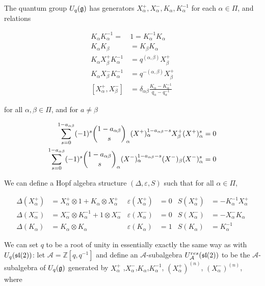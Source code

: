     \begin{defn}
    \label{UqgDef}
        The quantum group $U_q(\mathfrak{g})$ has generators
        $ X^+ _\alpha, X^-_\alpha, K_\alpha, K_\alpha^{-1}$ for each $\alpha \in
        \Pi$, and relations

        \begin{align}
            K_\alpha K_\alpha^{-1} =\ &1  = K_\alpha^{-1}K_\alpha \\
            K_\alpha K_\beta &= K_\beta K_\alpha \\
            K_\alpha  X^+ _\beta K_\alpha^{-1} &= q^{(\alpha, \beta)}  X^+ _\beta \\
            K_\alpha X^-_\beta K_\alpha^{-1} &= q^{-(\alpha, \beta)}  X^+ _\beta \\
            [ X^+ _\alpha, X^-_\beta] &= \delta_{\alpha\beta} \frac{K_\alpha - K_\alpha^{-1}}{ q_\alpha - q_\alpha^{-1}} 
        \end{align}

        for all $\alpha, \beta \in \Pi$, and for $a \neq \beta$

        \begin{align}
            \sum_{s=0}^{1-a_{\alpha\beta}} (-1)^s \dbinom{1-a_{\alpha\beta}}{s}_\alpha  (X^+)_\alpha^{1-a_{\alpha\beta} - s}  X^+_\beta  (X^+)_\alpha^s  &= 0 \\
            \sum_{s=0}^{1-a_{\alpha\beta}} (-1)^s \dbinom{1-a_{\alpha\beta}}{s}_\alpha (X^-)_\alpha^{1-a_{\alpha\beta} - s} (X^-)_\beta (X^-)_\alpha^s  &= 0 
        \end{align}
    \end{defn}

We can define a Hopf algebra structure $(\Delta, \varepsilon, S)$ such
that for all $\alpha \in \Pi$,

    \begin{align}
        \Delta(X^+ _\alpha) &=  X^+ _\alpha \otimes 1 + K_\alpha \otimes  X^+ _\alpha      & \varepsilon(X^+ _\alpha) &= 0  & S(X^+ _\alpha) &= -K_\alpha^{-1}  X^+ _\alpha \\
        \Delta(X^-_\alpha) &= X^-_\alpha \otimes K_\alpha^{-1} + 1 \otimes X^-_\alpha & \varepsilon(X^-_\alpha) &= 0  & S(X^-_\alpha) &= -X^-_\alpha K_\alpha \\
        \Delta(K_\alpha) &= K_\alpha \otimes K_\alpha                           & \varepsilon(K_\alpha) &= 1  & S(K_\alpha) &= K_\alpha^{-1}
    \end{align}


We can set $q$ to be a root of unity in essentially exactly the same way as
with $U_q(\mathfrak{sl}(2))$: let $\mathcal{A} = \mathbb{Z}[q,q^{-1}]$ and define an 
$\mathcal{A}$-subalgebra $U_\mathcal{A}^{res}(\mathfrak{sl}(2))$ to be the
$\mathcal{A}$-subalgebra of $U_q(\mathfrak{g})$ generated by $ X_\alpha^+$
,$X_\alpha^-$,$K_\alpha$,$K_\alpha^{-1}$, $(X_\alpha^+) ^{(n)}$,
$(X_\alpha^-)^{(n)}$, where


